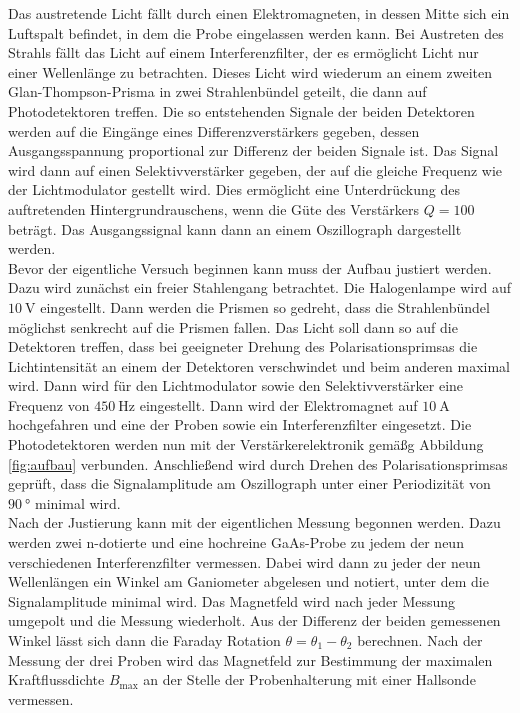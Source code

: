 Das austretende Licht fällt durch einen Elektromagneten, in dessen Mitte sich ein Luftspalt befindet, in dem die Probe eingelassen werden kann. 
Bei Austreten des Strahls fällt das Licht auf einem Interferenzfilter, der es ermöglicht Licht nur einer Wellenlänge zu betrachten. Dieses Licht
wird wiederum an einem zweiten Glan-Thompson-Prisma in zwei Strahlenbündel geteilt, die dann auf Photodetektoren treffen. Die so entstehenden 
Signale der beiden Detektoren werden auf die Eingänge eines Differenzverstärkers gegeben, dessen Ausgangsspannung proportional zur Differenz 
der beiden Signale ist. Das Signal wird dann auf einen Selektivverstärker gegeben, der auf die gleiche Frequenz wie der Lichtmodulator gestellt 
wird. Dies ermöglicht eine Unterdrückung des auftretenden Hintergrundrauschens, wenn die Güte des Verstärkers $Q = 100$ beträgt. Das Ausgangssignal
kann dann an einem Oszillograph dargestellt werden. \\

Bevor der eigentliche Versuch beginnen kann muss der Aufbau justiert werden. Dazu wird zunächst ein freier Stahlengang betrachtet. Die Halogenlampe 
wird auf $\SI{10}{\volt}$ eingestellt. Dann werden die Prismen so gedreht, dass die Strahlenbündel möglichst senkrecht auf die Prismen fallen. Das 
Licht soll dann so auf die Detektoren treffen, dass bei geeigneter Drehung des Polarisationsprimsas die Lichtintensität an einem der Detektoren 
verschwindet und beim anderen maximal wird. Dann wird für den Lichtmodulator sowie den Selektivverstärker eine Frequenz von $\SI{450}{\hertz}$
eingestellt. Dann wird der Elektromagnet auf $\SI{10}{\ampere}$ hochgefahren und eine der Proben sowie ein Interferenzfilter eingesetzt. Die Photodetektoren
werden nun mit der Verstärkerelektronik gemäßg Abbildung \ref{fig:aufbau} verbunden. Anschließend wird durch Drehen des Polarisationsprimsas 
geprüft, dass die Signalamplitude am Oszillograph unter einer Periodizität von $\SI{90}{\degree}$ minimal wird. \\

Nach der Justierung kann mit der eigentlichen Messung begonnen werden. Dazu werden zwei n-dotierte und eine hochreine GaAs-Probe zu jedem der 
neun verschiedenen Interferenzfilter vermessen. Dabei wird dann zu jeder der neun Wellenlängen ein Winkel am Ganiometer abgelesen und notiert, 
unter dem die Signalamplitude minimal wird. Das Magnetfeld wird nach jeder Messung umgepolt und die Messung wiederholt. Aus der Differenz der 
beiden gemessenen Winkel lässt sich dann die Faraday Rotation $\theta = \theta_1 - \theta_2$ berechnen. Nach der Messung der drei Proben 
wird das Magnetfeld zur Bestimmung der maximalen Kraftflussdichte $B_\text{max}$ an der Stelle der Probenhalterung mit einer Hallsonde vermessen.

